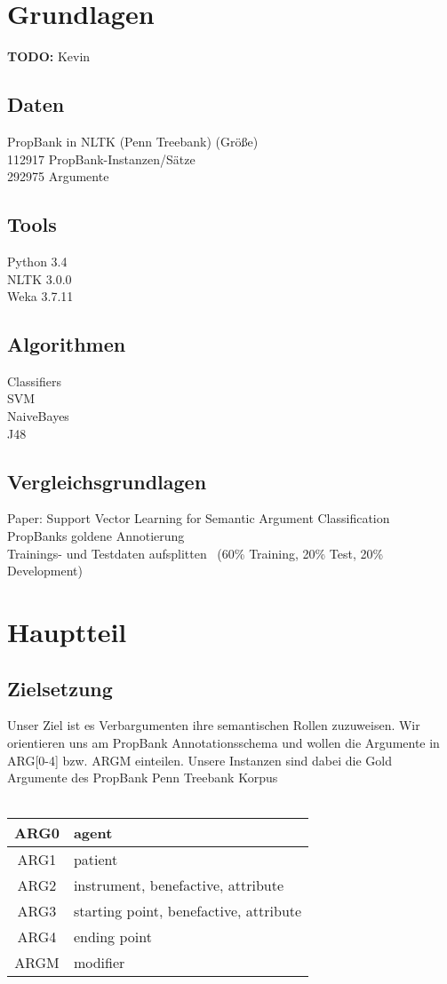 \documentclass[runningheads]{llncs}
\begin{document}
\section{Grundlagen}
\textbf{TODO:} Kevin
\subsection{Daten}
PropBank in NLTK (Penn Treebank) (Gr\"o\ss{}e)\\
112917 PropBank-Instanzen/S\"atze\\
292975 Argumente
\subsection{Tools}
Python 3.4\\
NLTK 3.0.0\\
Weka 3.7.11
\subsection{Algorithmen}
Classifiers\\
SVM\\
NaiveBayes\\
J48
\subsection{Vergleichsgrundlagen}
Paper: Support Vector Learning for Semantic Argument Classiﬁcation\\
PropBanks goldene Annotierung\\
Trainings- und Testdaten aufsplitten ~(60\% Training, 20\% Test, 20\% Development) 

\section{Hauptteil}
\subsection{Zielsetzung}

Unser Ziel ist es Verbargumenten ihre semantischen Rollen zuzuweisen. Wir orientieren uns am PropBank Annotationsschema und
wollen die Argumente in ARG[0-4] bzw. ARGM einteilen. Unsere Instanzen sind dabei die Gold Argumente des PropBank Penn Treebank Korpus\\
\\
\begin{table}
\centering
\begin{tabular}{|c|l|}
\hline 
ARG0 & agent \\ 
\hline 
ARG1 & patient \\ 
\hline 
ARG2 & instrument, benefactive, attribute \\ 
\hline 
ARG3 & starting point, benefactive, attribute \\ 
\hline 
ARG4 & ending point \\ 
\hline 
ARGM & modifier \\ 
\hline 
\end{tabular}
\end{table}
 
\end{document}
